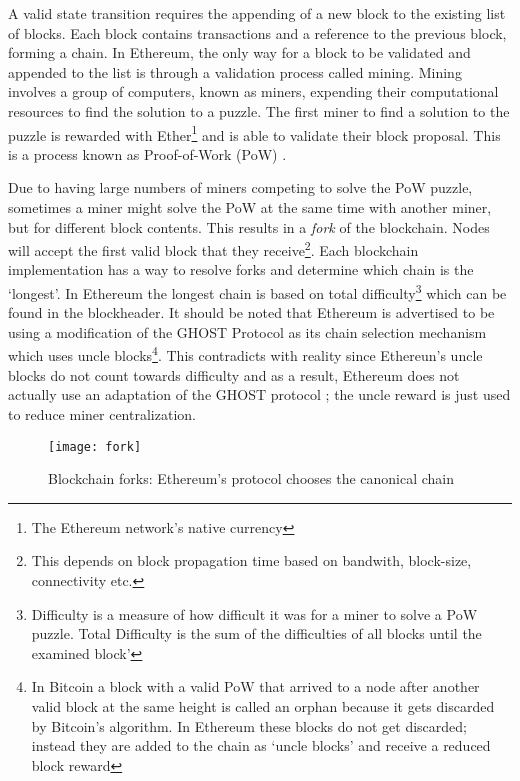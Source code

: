 A valid state transition requires the appending of a new block to the existing list of blocks. Each block contains transactions and a reference to the previous block, forming a chain. In Ethereum, the only way for a block to be validated and appended to the list is through a validation process called mining. Mining involves a group of computers, known as miners, expending their computational resources to find the solution to a puzzle. The first miner to find a solution to the puzzle is rewarded with Ether\footnote{The Ethereum network's native currency} and is able to validate their block proposal. This is a process known as Proof-of-Work (PoW) \cite{pow}. 

Due to having large numbers of miners competing to solve the PoW puzzle, sometimes a miner might solve the PoW at the same time with another miner, but for different block contents. This results in a \textit{fork} of the blockchain. Nodes will accept the first valid block that they receive\footnote{This depends on block propagation time based on bandwith, block-size, connectivity etc.}. Each blockchain implementation has a way to resolve forks and determine which chain is the `longest'. In Ethereum the longest chain is based on total difficulty\footnote{Difficulty is a measure of how difficult it was for a miner to solve a PoW puzzle. Total Difficulty is the sum of the difficulties of all blocks until the examined block'} which can be found in the blockheader. It should be noted that Ethereum is advertised to be using a modification of the GHOST Protocol\cite{GHOST} as its chain selection mechanism which uses uncle blocks\footnote{In Bitcoin a block with a valid PoW that arrived to a node after another valid block at the same height is called an orphan because it gets discarded by Bitcoin's algorithm. In Ethereum these blocks do not get discarded; instead they are added to the chain as `uncle blocks' and receive a reduced block reward}. This contradicts with reality since Ethereun's uncle blocks do not count towards difficulty and as a result, Ethereum does not actually use an adaptation of the GHOST protocol \cite{Gervais:2016:SPP:2976749.2978341}; the uncle reward is just used to reduce miner centralization.

\begin{figure}[H]
    \centering
    \texttt{[image: fork]}
    \caption{Blockchain forks: Ethereum's protocol chooses the canonical chain \cite{preethi}}
    \label{forking}
\end{figure}

